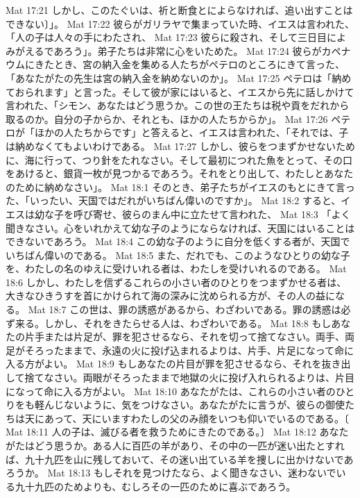 Mat 17:21  しかし、このたぐいは、祈と断食とによらなければ、追い出すことはできない〕」。
Mat 17:22  彼らがガリラヤで集まっていた時、イエスは言われた、「人の子は人々の手にわたされ、
Mat 17:23  彼らに殺され、そして三日目によみがえるであろう」。弟子たちは非常に心をいためた。
Mat 17:24  彼らがカペナウムにきたとき、宮の納入金を集める人たちがペテロのところにきて言った、「あなたがたの先生は宮の納入金を納めないのか」。
Mat 17:25  ペテロは「納めておられます」と言った。そして彼が家にはいると、イエスから先に話しかけて言われた、「シモン、あなたはどう思うか。この世の王たちは税や貢をだれから取るのか。自分の子からか、それとも、ほかの人たちからか」。
Mat 17:26  ペテロが「ほかの人たちからです」と答えると、イエスは言われた、「それでは、子は納めなくてもよいわけである。
Mat 17:27  しかし、彼らをつまずかせないために、海に行って、つり針をたれなさい。そして最初につれた魚をとって、その口をあけると、銀貨一枚が見つかるであろう。それをとり出して、わたしとあなたのために納めなさい」。
Mat 18:1  そのとき、弟子たちがイエスのもとにきて言った、「いったい、天国ではだれがいちばん偉いのですか」。
Mat 18:2  すると、イエスは幼な子を呼び寄せ、彼らのまん中に立たせて言われた、
Mat 18:3  「よく聞きなさい。心をいれかえて幼な子のようにならなければ、天国にはいることはできないであろう。
Mat 18:4  この幼な子のように自分を低くする者が、天国でいちばん偉いのである。
Mat 18:5  また、だれでも、このようなひとりの幼な子を、わたしの名のゆえに受けいれる者は、わたしを受けいれるのである。
Mat 18:6  しかし、わたしを信ずるこれらの小さい者のひとりをつまずかせる者は、大きなひきうすを首にかけられて海の深みに沈められる方が、その人の益になる。
Mat 18:7  この世は、罪の誘惑があるから、わざわいである。罪の誘惑は必ず来る。しかし、それをきたらせる人は、わざわいである。
Mat 18:8  もしあなたの片手または片足が、罪を犯させるなら、それを切って捨てなさい。両手、両足がそろったままで、永遠の火に投げ込まれるよりは、片手、片足になって命に入る方がよい。
Mat 18:9  もしあなたの片目が罪を犯させるなら、それを抜き出して捨てなさい。両眼がそろったままで地獄の火に投げ入れられるよりは、片目になって命に入る方がよい。
Mat 18:10  あなたがたは、これらの小さい者のひとりをも軽んじないように、気をつけなさい。あなたがたに言うが、彼らの御使たちは天にあって、天にいますわたしの父のみ顔をいつも仰いでいるのである。〔
Mat 18:11  人の子は、滅びる者を救うためにきたのである。〕
Mat 18:12  あなたがたはどう思うか。ある人に百匹の羊があり、その中の一匹が迷い出たとすれば、九十九匹を山に残しておいて、その迷い出ている羊を捜しに出かけないであろうか。
Mat 18:13  もしそれを見つけたなら、よく聞きなさい、迷わないでいる九十九匹のためよりも、むしろその一匹のために喜ぶであろう。
